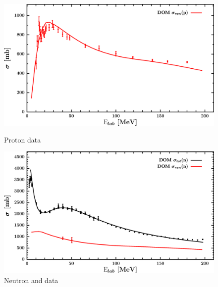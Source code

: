 \begin{figure}[H]
    \centering
    \begin{minipage}{0.45\textwidth}
        \centering
        \includegraphics[width=1.0\textwidth]{figures/ca40_protonInelastic.png}
        \caption{Proton \rxn data}
        \label{DOMFitData_ca40_proton_inelastic}
    \end{minipage}\hfill
    \begin{minipage}{0.45\textwidth}
        \centering
        \includegraphics[width=1.0\textwidth]{figures/ca40_neutronInelastic.png}
        \caption{Neutron \rxn and \tot data}
        \label{DOMFitData_ca40_neutron_inelastic}
    \end{minipage}
\end{figure}

\afterpage{\clearpage}


